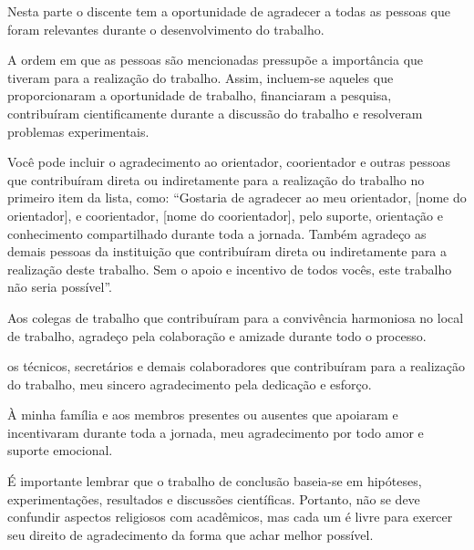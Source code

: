 %
\pagestyle{empty}

\begin{agradecimentos}
\begin{incisos}
\item Nesta parte o discente tem a oportunidade de agradecer a todas as pessoas que foram relevantes durante o desenvolvimento do trabalho.
\item A ordem em que as pessoas são mencionadas pressupõe a importância que tiveram para a realização do trabalho. Assim, incluem-se aqueles que proporcionaram a oportunidade de trabalho, financiaram a pesquisa, contribuíram cientificamente durante a discussão do trabalho e resolveram problemas experimentais.
\item Você pode incluir o agradecimento ao orientador, coorientador e outras pessoas que contribuíram direta ou indiretamente para a realização do trabalho no primeiro item da lista, como: ``Gostaria de agradecer ao meu orientador, [nome do orientador], e coorientador, [nome do coorientador], pelo suporte, orientação e conhecimento compartilhado durante toda a jornada. Também agradeço as demais pessoas da instituição que contribuíram direta ou indiretamente para a realização deste trabalho. Sem o apoio e incentivo de todos vocês, este trabalho não seria possível''.
\item Aos colegas de trabalho que contribuíram para a convivência harmoniosa no local de trabalho, agradeço pela colaboração e amizade durante todo o processo.
\item os técnicos, secretários e demais colaboradores que contribuíram para a realização do trabalho, meu sincero agradecimento pela dedicação e esforço.
\item 	À minha família e aos membros presentes ou ausentes que apoiaram e incentivaram durante toda a jornada, meu agradecimento por todo amor e suporte emocional.
\item É importante lembrar que o trabalho de conclusão baseia-se em hipóteses, experimentações, resultados e discussões científicas. Portanto, não se deve confundir aspectos religiosos com acadêmicos, mas cada um é livre para exercer seu direito de agradecimento da  forma que achar melhor possível.
\end{incisos}

\end{agradecimentos}
